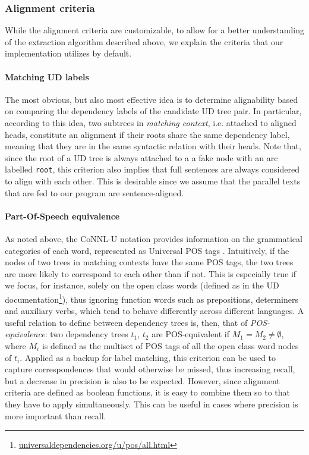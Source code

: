 \documentclass[11pt]{article}
\begin{document}
\subsubsection{Alignment criteria} \label{criteria}
While the alignment criteria are customizable, to allow for a better understanding of the extraction algorithm described above, we explain the criteria that our implementation utilizes by default.

\paragraph{Matching UD labels}
The most obvious, but also most effective idea is to determine alignability based on comparing the dependency labels of the candidate UD tree pair. 
In particular, according to this idea, two subtrees in \textit{matching context}, i.e. attached to aligned heads, constitute an alignment if their roots share the same dependency label, meaning that they are in the same syntactic relation with their heads.
Note that, since the root of a UD tree is always attached to a a fake node with an arc labelled \texttt{root}, this criterion also implies that full sentences are always considered to align with each other.
This is desirable since we assume that the parallel texts that are fed to our program are sentence-aligned.

\paragraph{Part-Of-Speech equivalence}
As noted above, the CoNNL-U notation provides information on the grammatical categories of each word, represented as Universal POS tags \cite{petrov-etal-2012-universal}. 
Intuitively, if the nodes of two trees in matching contexts have the same POS tags, the two trees are more likely to correspond to each other than if not. 
This is especially true if we focus, for instance, solely on the open class words (defined as in the UD documentation\footnote{\url{universaldependencies.org/u/pos/all.html}}), thus ignoring function words such as prepositions, determiners and auxiliary verbs, which tend to behave differently across different languages.
A useful relation to define between dependency trees is, then, that of \textit{POS-equivalence}: two dependency trees $t_1$, $t_2$ are POS-equivalent if $M_1 = M_2 \neq \emptyset$, where $M_i$ is defined as the multiset of POS tags of all the open class word nodes of $t_i$. 
Applied as a backup for label matching, this criterion can be used to capture correspondences that would otherwise be missed, thus increasing recall, but a decrease in precision is also to be expected. 
However, since alignment criteria are defined as boolean functions, it is easy to combine them so to that they have to apply simultaneously. This can be useful in cases where precision is more important than recall.
\end{document}
